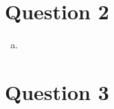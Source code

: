 \documentclass[12pt]{article}
\begin{document}
\begin{enumerate}
\begin{itemize}
    \end{itemize}


\end{enumerate}

\section*{Question 2}
\begin{enumerate}[a.]
    \item


\end{enumerate}

\section*{Question 3}
\end{document}

